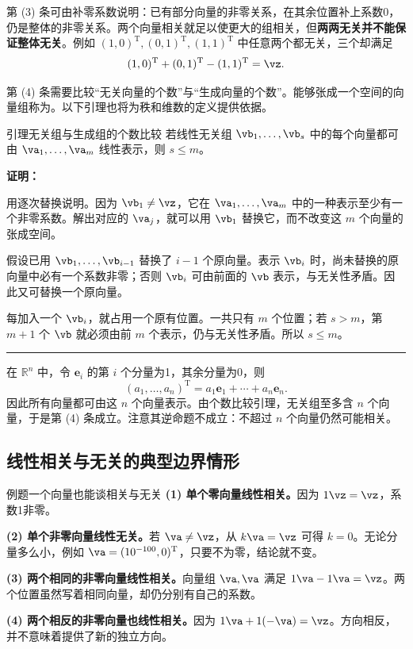 \documentclass[a4paper,12pt,twoside,openany,fontset=none]{ctexbook}
\renewcommand{\le}{\leqslant}
\newenvironment{lemma}[1][]{\begin{thmBox}{引理}{#1}}{\end{thmBox}}
\newcounter{example}[chapter]
\newenvironment{example}[1][]{\begin{exBox}{例题}{#1}}{\end{exBox}}
\renewenvironment{proof}{
    \par\vspace{0.5em}\noindent
    \textbf{\color{LogicColor} 证明：}
}{
    \hfill \textcolor{LogicColor}{\rule{0.6em}{0.6em}} \par
}
\numberwithin{equation}{chapter}
\begin{document}
第 (3) 条可由补零系数说明：已有部分向量的非零关系，在其余位置补上系数0，仍是整体的非零关系。两个向量相关就足以使更大的组相关，但\textbf{两两无关并不能保证整体无关}。例如 $(1,0)^{\mathrm T},(0,1)^{\mathrm T},(1,1)^{\mathrm T}$ 中任意两个都无关，三个却满足
\[
    (1,0)^{\mathrm T}+(0,1)^{\mathrm T}-(1,1)^{\mathrm T}=\vz.
\]

第 (4) 条需要比较“无关向量的个数”与“生成向量的个数”。能够张成一个空间的向量组称为。以下引理也将为秩和维数的定义提供依据。

\begin{lemma}[无关组与生成组的个数比较]
若线性无关组 $\vb_1,\ldots,\vb_s$ 中的每个向量都可由 $\va_1,\ldots,\va_m$ 线性表示，则 $s\le m$。
\end{lemma}

\begin{proof}
用逐次替换说明。因为 $\vb_1\ne\vz$，它在 $\va_1,\ldots,\va_m$ 中的一种表示至少有一个非零系数。解出对应的 $\va_j$，就可以用 $\vb_1$ 替换它，而不改变这 $m$ 个向量的张成空间。

假设已用 $\vb_1,\ldots,\vb_{i-1}$ 替换了 $i-1$ 个原向量。表示 $\vb_i$ 时，尚未替换的原向量中必有一个系数非零；否则 $\vb_i$ 可由前面的 $\vb$ 表示，与无关性矛盾。因此又可替换一个原向量。

每加入一个 $\vb_i$，就占用一个原有位置。一共只有 $m$ 个位置；若 $s>m$，第 $m+1$ 个 $\vb$ 就必须由前 $m$ 个表示，仍与无关性矛盾。所以 $s\le m$。
\end{proof}

在 $\mathbb{R}^n$ 中，令 $\boldsymbol{e}_i$ 的第 $i$ 个分量为1，其余分量为0，则
\[
    (a_1,\ldots,a_n)^{\mathrm T}=a_1\boldsymbol{e}_1+\cdots+a_n\boldsymbol{e}_n.
\]
因此所有向量都可由这 $n$ 个向量表示。由个数比较引理，无关组至多含 $n$ 个向量，于是第 (4) 条成立。注意其逆命题不成立：不超过 $n$ 个向量仍然可能相关。

\subsection*{线性相关与无关的典型边界情形}

\begin{example}[一个向量也能谈相关与无关]
\textbf{(1) 单个零向量线性相关。}因为 $1\vz=\vz$，系数1非零。

\textbf{(2) 单个非零向量线性无关。}若 $\va\ne\vz$，从 $k\va=\vz$ 可得 $k=0$。无论分量多么小，例如 $\va=(10^{-100},0)^{\mathrm T}$，只要不为零，结论就不变。

\textbf{(3) 两个相同的非零向量线性相关。}向量组 $\va,\va$ 满足 $1\va-1\va=\vz$。两个位置虽然写着相同向量，却仍分别有自己的系数。

\textbf{(4) 两个相反的非零向量也线性相关。}因为 $1\va+1(-\va)=\vz$。方向相反，并不意味着提供了新的独立方向。
\end{example}
\end{document}
